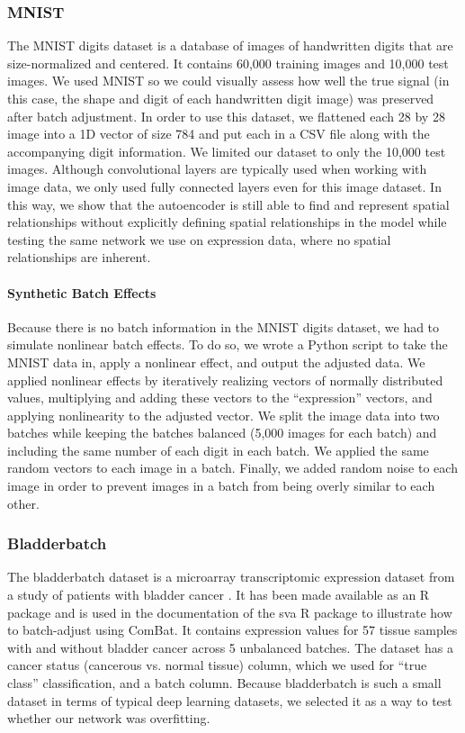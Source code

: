 \documentclass[notitlepage]{article}
\begin{document}
\subsubsection{MNIST}

The MNIST digits dataset \cite{lecun_mnist_nodate} is a database of images of handwritten digits that are size-normalized and centered.
It contains 60,000 training images and 10,000 test images.
We used MNIST so we could visually assess how well the true signal (in this case, the shape and digit of each handwritten digit image) was preserved after batch adjustment.
In order to use this dataset, we flattened each 28 by 28 image into a 1D vector of size 784 and put each in a CSV file along with the accompanying digit information.
We limited our dataset to only the 10,000 test images.
Although convolutional layers are typically used when working with image data, we only used fully connected layers even for this image dataset.
In this way, we show that the autoencoder is still able to find and represent spatial relationships without explicitly defining spatial relationships in the model while testing the same network we use on expression data, where no spatial relationships are inherent.

\paragraph{Synthetic Batch Effects}

Because there is no batch information in the MNIST digits dataset, we had to simulate nonlinear batch effects.
To do so, we wrote a Python script to take the MNIST data in, apply a nonlinear effect, and output the adjusted data.
We applied nonlinear effects by iteratively realizing vectors of normally distributed values, multiplying and adding these vectors to the ``expression'' vectors, and applying nonlinearity to the adjusted vector.
We split the image data into two batches while keeping the batches balanced (5,000 images for each batch) and including the same number of each digit in each batch.
We applied the same random vectors to each image in a batch.
Finally, we added random noise to each image in order to prevent images in a batch from being overly similar to each other.

\subsubsection{Bladderbatch}

The bladderbatch dataset is a microarray transcriptomic expression dataset from a study of patients with bladder cancer \cite{dyrskjot_gene_2004}.
It has been made available as an R package \cite{leek_bladderbatch_2017} and is used in the documentation of the sva R package \cite{leek_sva_2017} to illustrate how to batch-adjust using ComBat.
It contains expression values for 57 tissue samples with and without bladder cancer across 5 unbalanced batches.
The dataset has a cancer status (cancerous vs. normal tissue) column, which we used for ``true class'' classification, and a batch column.
Because bladderbatch is such a small dataset in terms of typical deep learning datasets, we selected it as a way to test whether our network was overfitting.
\end{document}

